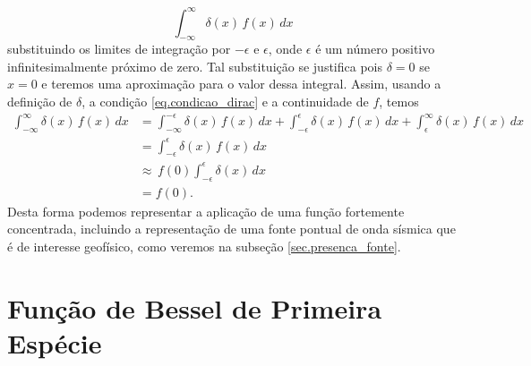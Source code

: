 \begin{equation}
\int_{-\infty}^{\infty}\delta(x)\,f(x)\,dx
\end{equation}
substituindo os limites de integra\c{c}\~ao por $-\epsilon$ e $\epsilon$, onde $\epsilon$ \'e um n\'umero positivo infinitesimalmente pr\'oximo de zero. Tal substitui\c{c}\~ao se justifica pois $\delta=0$ se $x=0$ e teremos uma aproxima\c{c}\~ao para o valor dessa integral. Assim, usando a defini\c{c}\~ao de $\delta$, a condi\c{c}\~ao \ref{eq.condicao_dirac} e a continuidade de $f$, temos
\begin{align*}
\int_{-\infty}^{\infty}\delta(x)\,f(x)\,dx&=\int_{-\infty}^{-\epsilon}\delta(x)\,f(x)\,dx+\int_{-\epsilon}^{\epsilon}\delta(x)\,f(x)\,dx+\int_{\epsilon}^{\infty}\delta(x)\,f(x)\,dx\\
&=\int_{-\epsilon}^{\epsilon}\delta(x)\,f(x)\,dx\\
&\approx\,f(0)\int_{-\epsilon}^{\epsilon}\delta(x)\,dx\\
&=f(0).
\end{align*}
Desta forma podemos representar a aplica\c{c}\~ao de uma fun\c{c}\~ao fortemente concentrada, incluindo a representa\c{c}\~ao de uma fonte pontual de onda s\'ismica que \'e de interesse geof\'isico, como veremos na subse\c{c}\~ao \ref{sec.presenca_fonte}.

\section{Fun\c{c}\~ao de Bessel de Primeira Esp\'ecie}

